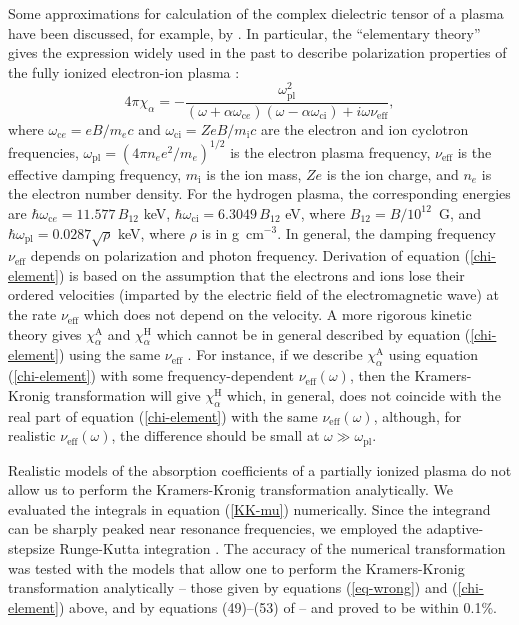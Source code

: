 \documentclass{emulateapj}
\newcommand{\beq}{\begin{equation}}
\newcommand{\eeq}{\end{equation}}
\newcommand{\req}[1]{equation (\ref{#1})}
\newcommand{\gcc}{\mbox{g cm$^{-3}$}}
\newcommand{\mel}{m_e}
\newcommand{\chiH}{\chi^\mathrm{H}}
\newcommand{\chiA}{\chi^\mathrm{A}}
\newcommand{\nueff}{\nu_\mathrm{eff}}
\newcommand{\omc}{\omega_{\mathrm{c}e}} %
\newcommand{\omci}{\omega_{\mathrm{ci}}} %
\newcommand{\ompl}{\omega_\mathrm{pl}} %
\begin{document}
Some approximations for calculation of 
the complex dielectric tensor of a plasma have been discussed,
for example, by \citet{Ginzburg}. In particular, 
the ``elementary theory'' gives the expression widely used in the
past to describe polarization properties 
of the fully ionized electron-ion plasma 
\citep[e.g.,][]{Shib92,Zane00,HoLai,HoLai02}:
\beq
 4\pi\chi_\alpha = - \frac{\ompl^2
 }{
 (\omega+\alpha\omc) (\omega - \alpha\omci) + i \omega \nueff
 },
\label{chi-element}
\eeq
where $\omc=eB/\mel c$ and $\omci=ZeB/m_\mathrm{i} c$ are
the electron and ion cyclotron frequencies, 
$\ompl = (4\pi n_e e^2 / \mel)^{1/2}$ is the electron plasma frequency,
$\nueff$ is the effective damping frequency,
$m_\mathrm{i}$ is the ion mass,
$Ze$ is the ion charge,
and $n_e$ is the electron number density.
For the hydrogen plasma, the corresponding energies are
$\hbar\omc = 11.577\,B_{12}$ keV, $\hbar\omci = 6.3049\,B_{12}$ eV, 
where $B_{12}=B/10^{12}$~G,
and $\hbar\ompl= 0.0287\sqrt{\rho}$ keV, where $\rho$ is in \gcc.
In general, the damping frequency $\nueff$ depends on polarization and
photon frequency. Derivation of \req{chi-element} is 
based on the assumption that the electrons and ions lose their ordered
velocities (imparted by the electric field of the electromagnetic wave)
at the rate $\nueff$ which does not depend on the velocity. 
A more rigorous kinetic theory
gives $\chiA_\alpha$ and $\chiH_\alpha$ which cannot be in general described
by \req{chi-element}
using the same $\nueff$ \citep[e.g.,][ \S6]{Ginzburg}.
For instance, if we describe $\chiA_\alpha$ using
\req{chi-element} with some frequency-dependent $\nueff(\omega)$,
then the Kramers-Kronig transformation will give
$\chiH_\alpha$ which, in general, does not coincide with the real
part of \req{chi-element} with the same $\nueff(\omega)$,
although, for realistic $\nueff(\omega)$,
the difference should be small at $\omega\gg\ompl$.

Realistic models of the absorption coefficients of a partially ionized
plasma do not allow us to perform the Kramers-Kronig transformation
analytically. We evaluated the integrals in \req{KK-mu} numerically.
Since the integrand can be sharply peaked near resonance frequencies,
we employed the adaptive-stepsize Runge-Kutta integration
\citep[ \S16.2]{NRF}. The accuracy of the numerical transformation
was tested with the models that allow one to perform 
the Kramers-Kronig transformation analytically --
those given by equations (\ref{eq-wrong}) and (\ref{chi-element}) 
above, and by equations (49)--(53) of \citet{BulikPavlov}
-- and proved to be within 0.1\%.
\end{document}
